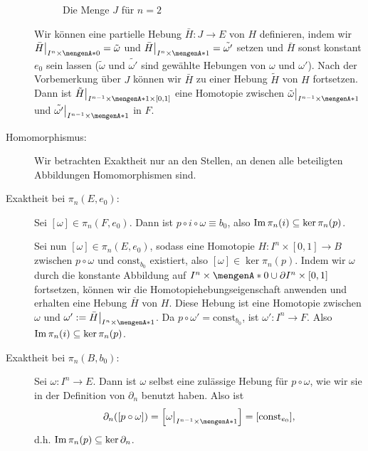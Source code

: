 \begin{description}
\begin{figure}[H]
{
		\caption{Die Menge $J$ für $n=2$}}
	\end{figure}
	Wir können eine partielle Hebung $\bar{H} : J \to E$ von $H$ definieren, indem wir $\bar{H} \big|_{I^n \times \set{0}} = \tilde{\omega}$ und 
	$\bar{H} \big|_{I^n \times \set{1}} = \tilde{\omega'}$ setzen und $\bar{H}$ sonst konstant $e_0$ sein lassen ($\tilde{\omega}$ und $\tilde{\omega'}$ sind gewählte
	Hebungen von $\omega$ und $\omega'$). Nach der Vorbemerkung über $J$ können wir $\bar{H}$ zu einer Hebung $\tilde{H}$ von $H$ fortsetzen. Dann ist 
	$\tilde{H} \big|_{I^{n-1} \times \set{1} \times [0,1] }$ eine Homotopie zwischen $\tilde{\omega} \big|_{I^{n-1} \times \set{1}}$ und 
	$\tilde{\omega'} \big|_{I^{n-1} \times \set{1}}$ in $F$.
	\item[Homomorphismus:] Wir betrachten Exaktheit nur an den Stellen, an denen alle beteiligten Abbildungen Homomorphismen sind.
	\item[Exaktheit bei $\pi_n(E,e_0)$:] Sei $[\omega ] \in \pi_n(F, e_0)$. Dann ist $p \circ i \circ \omega \equiv b_0$, also $\operatorname{Im} \pi_n (i) \subseteq \ker \pi_n(p)$.
	
	Sei nun $[\omega ] \in \pi_n(E, e_0)$, sodass eine Homotopie $H : I^n \times [0,1] \to B$ zwischen $p \circ \omega$ und $\mathrm{const}_{b_0}$ existiert, also
	$[\omega] \in \ker \pi_n(p)$. Indem wir $\omega$ durch die konstante Abbildung auf $I^n \times \set{0} \cup \partial I^n \times [0,1]$ fortsetzen, können wir die
	Homotopiehebungseigenschaft anwenden und erhalten eine Hebung $\bar{H}$ von $H$. Diese Hebung ist eine Homotopie zwischen $\omega$ und 
	$\omega' := \bar{H} \big|_{I^n \times \set{1} }$. Da $p \circ \omega' = \mathrm{const}_{b_0}$, ist $\omega' : I^n \to F$. Also $\operatorname{Im} \pi_n(i) \subseteq \ker \pi_n(p)$.
	\item[Exaktheit bei $\pi_n(B, b_0)$:] Sei $\omega : I^n \to E$. Dann ist $\omega$ selbst eine zulässige Hebung für $p \circ \omega$, wie wir sie in der Definition von
	$\partial_n$ benutzt haben. Also ist
	\[
		\partial_n \enbrace*{[p \circ \omega]} = \benbrace*{\omega \big|_{I^{n-1} \times \set{1}}}  = \benbrace*{\mathrm{const}_{e_0}}, 
	\]
	d.h. $\operatorname{Im} \pi_n(p) \subseteq \ker \partial_n$.
	

\end{description}
